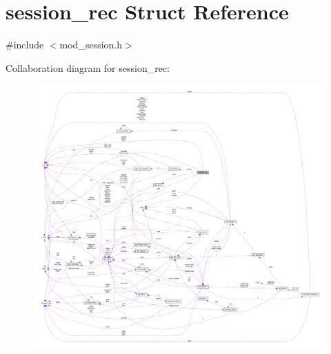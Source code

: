 \hypertarget{structsession__rec}{}\section{session\+\_\+rec Struct Reference}
\label{structsession__rec}


{\ttfamily \#include $<$mod\+\_\+session.\+h$>$}



Collaboration diagram for session\+\_\+rec\+:
\nopagebreak
\begin{figure}[H]
\begin{center}
\leavevmode
\includegraphics[width=350pt]{structsession__rec__coll__graph}
\end{center}
\end{figure}
